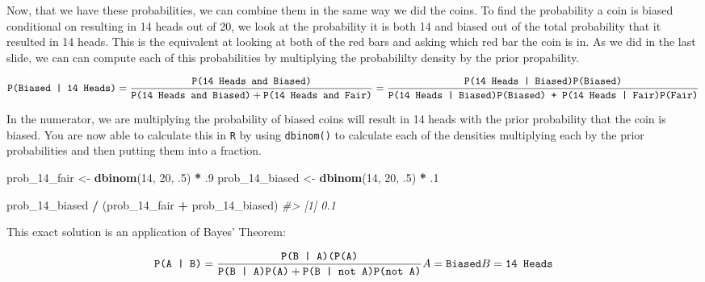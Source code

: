 \documentclass[]{article}
\newenvironment{Shaded}{\begin{snugshade}}{\end{snugshade}}
\newcommand{\CommentTok}[1]{\textcolor[rgb]{0.56,0.35,0.01}{\textit{#1}}}
\newcommand{\DecValTok}[1]{\textcolor[rgb]{0.00,0.00,0.81}{#1}}
\newcommand{\FloatTok}[1]{\textcolor[rgb]{0.00,0.00,0.81}{#1}}
\newcommand{\KeywordTok}[1]{\textcolor[rgb]{0.13,0.29,0.53}{\textbf{#1}}}
\newcommand{\NormalTok}[1]{#1}
\newcommand{\OperatorTok}[1]{\textcolor[rgb]{0.81,0.36,0.00}{\textbf{#1}}}
\newcommand{\StringTok}[1]{\textcolor[rgb]{0.31,0.60,0.02}{#1}}
\begin{document}
Now, that we have these probabilities, we can combine them in the same
way we did the coins. To find the probability a coin is biased
conditional on resulting in 14 heads out of 20, we look at the
probability it is both 14 and biased out of the total probability that
it resulted in 14 heads. This is the equivalent at looking at both of
the red bars and asking which red bar the coin is in. As we did in the
last slide, we can can compute each of this probabilities by multiplying
the probabililty density by the prior propability.

\[\texttt{P(Biased | 14 Heads)} \\ = 
\frac{\texttt{P(14 Heads and Biased)}}{\texttt{P(14 Heads and Biased)} + \texttt{P(14 Heads and Fair)}} \\ = 
\frac{\texttt{P(14 Heads | Biased)P(Biased)}}{\texttt{P(14 Heads | Biased)P(Biased) + P(14 Heads | Fair)P(Fair)}} \]

In the numerator, we are multiplying the probability of biased coins
will result in 14 heads with the prior probability that the coin is
biased. You are now able to calculate this in \texttt{R} by using
\texttt{dbinom()} to calculate each of the densities multiplying each by
the prior probabilities and then putting them into a fraction.

\begin{Shaded}
\begin{Highlighting}[]
\NormalTok{prob_}\DecValTok{14}\NormalTok{_fair <-}\StringTok{ }\KeywordTok{dbinom}\NormalTok{(}\DecValTok{14}\NormalTok{, }\DecValTok{20}\NormalTok{, }\FloatTok{.5}\NormalTok{) }\OperatorTok{*}\StringTok{ }\FloatTok{.9}
\NormalTok{prob_}\DecValTok{14}\NormalTok{_biased <-}\StringTok{ }\KeywordTok{dbinom}\NormalTok{(}\DecValTok{14}\NormalTok{, }\DecValTok{20}\NormalTok{, }\FloatTok{.5}\NormalTok{) }\OperatorTok{*}\StringTok{ }\FloatTok{.1}

\NormalTok{prob_}\DecValTok{14}\NormalTok{_biased }\OperatorTok{/}\StringTok{ }\NormalTok{(prob_}\DecValTok{14}\NormalTok{_fair }\OperatorTok{+}\StringTok{ }\NormalTok{prob_}\DecValTok{14}\NormalTok{_biased)}
\CommentTok{#> [1] 0.1}
\end{Highlighting}
\end{Shaded}

This exact solution is an application of Bayes' Theorem:

\[\texttt{P(A | B)} \\ = 
\frac{\texttt{P(B | A)(P(A)}}{\texttt{P(B | A)P(A)} + \texttt{P(B | not A)P(not A)}} \\ A = \texttt{Biased} \\ B = \texttt{14 Heads}\]
\end{document}
